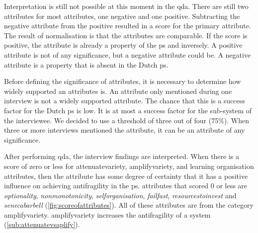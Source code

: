 Interpretation is still not possible at this moment in the \gls{qda}. There are still two \glspl{attribute} for most \glspl{attribute}, one negative and one positive. Subtracting the negative \gls{attribute} from the positive resulted in a score for the primary \gls{attribute}. The result of normalisation is that the \glspl{attribute} are comparable. If the score is positive, the \gls{attribute} is already a property of the \gls{ps} and inversely. A positive \gls{attribute} is not of any significance, but a negative \gls{attribute} could be. A negative attribute is a property that is absent in the Dutch \gls{ps}.
 
Before defining the significance of \glspl{attribute}, it is necessary to determine how widely supported an \glspl{attribute} is. An \gls{attribute} only mentioned during one interview is not a widely supported \gls{attribute}. The chance that this is a success factor for the Dutch \gls{ps} is low. It is at most a success factor for the sub-system of the interviewee. We decided to use a threshold of three out of four (75\%). When three or more interviews mentioned the attribute, it can be an attribute of any significance.

After performing \gls{qda}, the interview findings are interpreted. When there is a score of zero or less for \gls{attenuatevariety}, \gls{amplifyvariety}, and learning organisation \glspl{attribute}, then the \gls{attribute} has some degree of certainty that it has a positive influence on achieving \gls{antifragility} in the \gls{ps}. \Glspl{attribute} that scored 0 or less are \textit{\gls{optionality}}, \textit{\gls{nonmonotonicity}}, \textit{\gls{selforganisation}}, \textit{\gls{failfast}}, \textit{\gls{resourcestoinvest}} and \textit{\gls{senecabarbell}} (\cref{fig:scoreofattributes}). All of these \glspl{attribute} are from the category \gls{amplifyvariety}. \Gls{amplifyvariety} increases the \gls{antifragility} of a system (\cref{sub:attenuatevsaplify}).

